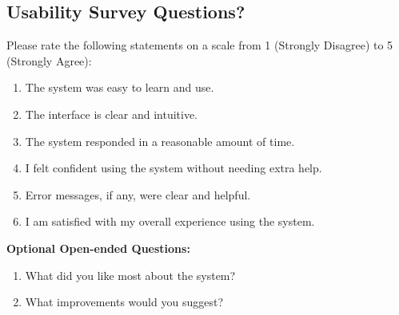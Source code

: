 \documentclass[12pt, titlepage]{article}
\begin{document}
\subsection{Usability Survey Questions?}
\label{sub:survey}
Please rate the following statements on a scale from 1 (Strongly Disagree) to 5 (Strongly Agree):

\begin{enumerate}
    \item The system was easy to learn and use.
    \item The interface is clear and intuitive.
    \item The system responded in a reasonable amount of time.
    \item I felt confident using the system without needing extra help.
    \item Error messages, if any, were clear and helpful.
    \item I am satisfied with my overall experience using the system.
\end{enumerate}

\vspace{1em}

\noindent \textbf{Optional Open-ended Questions:}
\begin{enumerate}
    \item What did you like most about the system?
    \item What improvements would you suggest?
\end{enumerate}
\end{document}
